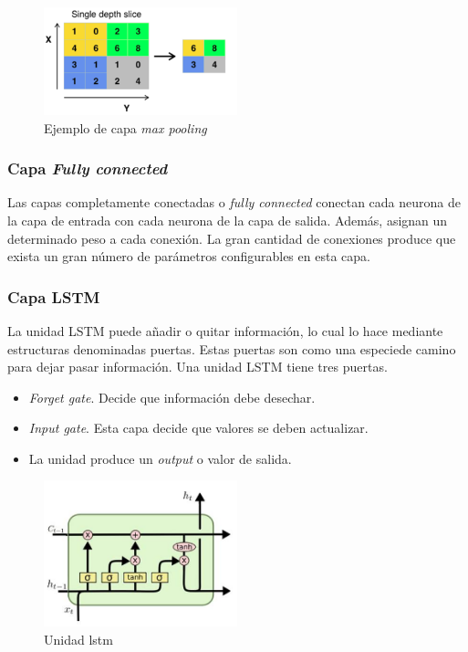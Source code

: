 \begin{figure}[H]
  \begin{center}
    \includegraphics[width=0.5\textwidth]{figures/Introduccion/pooling.png}
		\caption{Ejemplo de capa \textit{max pooling}}
		\label{fig.pooling}
		\end{center}
\end{figure}


\subsubsection{Capa \textit{Fully connected}}

Las capas completamente conectadas o \textit{fully connected} conectan cada neurona de la capa de entrada con cada neurona de la capa de salida. Además, asignan un determinado peso a cada conexión. La gran cantidad de conexiones produce que exista un gran número de parámetros configurables en esta capa.


\subsubsection{Capa LSTM}

La unidad LSTM puede añadir o quitar información, lo cual lo hace mediante estructuras denominadas puertas. Estas puertas son como una especiede camino para dejar pasar información. Una unidad LSTM tiene tres puertas.

\begin{itemize}
    \item \textit{Forget gate}. Decide que información debe desechar. 
    \item \textit{Input gate}. Esta capa decide que valores se deben actualizar.
    \item La unidad produce un \textit{output} o valor de salida.
\end{itemize}

\begin{figure}[H]
  \begin{center}
    \includegraphics[width=0.5\textwidth]{figures/Introduccion/unidad_lstm.png}
		\caption{Unidad \acrshort{lstm}}
		\label{fig.unidad_lstm}
		\end{center}
\end{figure}
